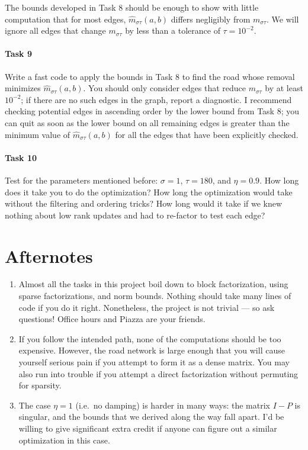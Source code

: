 \documentclass[12pt, leqno]{article}
\begin{document}
The bounds developed in Task 8 should be enough to show with little
computation that for most edges, $\hat{m}_{\sigma \tau}(a,b)$ differs
negligibly from $m_{\sigma \tau}$.  We will ignore all edges that
change $m_{\sigma \tau}$ by less than a tolerance of $\tau = 10^{-2}$.

\paragraph*{Task 9}
Write a fast code to apply the bounds in Task 8 to find the road
whose removal minimizes $\hat{m}_{\sigma \tau}(a,b)$.  You should
only consider edges that reduce $m_{\sigma \tau}$ by at least
$10^{-2}$; if there are no such edges in the graph, report a
diagnostic.  I recommend checking potential edges in ascending
order by the lower bound from Task 8; you can quit as soon
as the lower bound on all remaining edges is greater than
the minimum value of $\hat{m}_{\sigma \tau}(a,b)$ for all the edges
that have been explicitly checked.

\paragraph*{Task 10}
Test for the parameters mentioned before: $\sigma = 1$, $\tau = 180$,
and $\eta = 0.9$.  How long does it take you to do the optimization?
How long the optimization would take without the filtering and
ordering tricks?  How long would it take if we knew nothing about low
rank updates and had to re-factor to test each edge?

\section*{Afternotes}

\begin{enumerate}
\item Almost all the tasks in this project boil down to block factorization,
  using sparse factorizations, and norm bounds.  Nothing should take
  many lines of code if you do it right.  Nonetheless, the project is
  not trivial --- so ask questions!  Office hours and Piazza are your friends.
\item If you follow the intended path, none of the computations should
  be too expensive.  However, the road network is large enough that
  you will cause yourself serious pain if you attempt to form it as a
  dense matrix.  You may also run into trouble if you attempt a direct
  factorization without permuting for sparsity.  
\item The case $\eta = 1$ (i.e.~no damping) is harder in many ways:
  the matrix $I-P$ is singular, and the bounds that we derived along
  the way fall apart.  I'd be willing to give significant extra credit
  if anyone can figure out a similar optimization in this case.
\end{enumerate}
\end{document}

